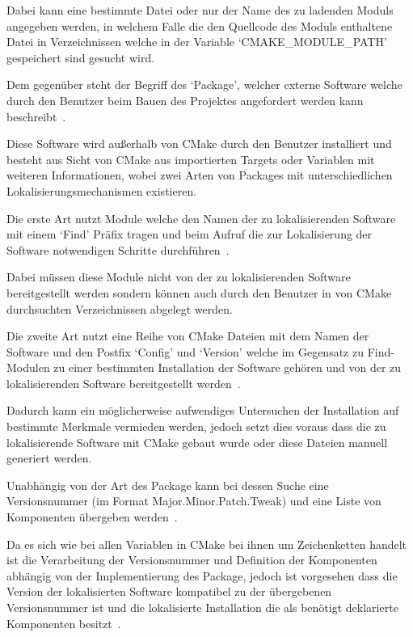 \documentclass[german,proseminar,hyperref,utf8]{zihpub}
\begin{document}
    Dabei kann eine bestimmte Datei oder nur der Name des zu ladenden Moduls angegeben werden,
    in welchem Falle die den Quellcode des Moduls enthaltene Datei in Verzeichnissen welche in
    der Variable `CMAKE\_MODULE\_PATH' gespeichert sind gesucht wird.

    Dem gegenüber steht der Begriff des `Package', welcher externe Software welche durch den
    Benutzer beim Bauen des Projektes angefordert werden kann
    beschreibt~.

    Diese Software wird au{\ss}erhalb von CMake durch den Benutzer installiert und besteht aus
    Sicht von CMake aus importierten Targets oder Variablen mit weiteren Informationen, wobei
    zwei Arten von Packages mit unterschiedlichen Lokalisierungsmechanismen existieren.

    Die erste Art nutzt Module welche den Namen der zu lokalisierenden Software mit einem `Find'
    Präfix tragen und beim Aufruf die zur Lokalisierung der Software notwendigen Schritte
    durchführen~.

    Dabei müssen diese Module nicht von der zu lokalisierenden Software bereitgestellt werden sondern
    können auch durch den Benutzer in von CMake durchsuchten Verzeichnissen abgelegt werden.

    Die zweite Art nutzt eine Reihe von CMake Dateien mit dem Namen der Software und den Postfix `Config'
    und `Version' welche im Gegensatz zu Find-Modulen zu einer bestimmten Installation der Software
    gehören und von der zu lokalisierenden Software bereitgestellt
    werden~.

    Dadurch kann ein möglicherweise aufwendiges Untersuchen der Installation auf bestimmte Merkmale
    vermieden werden, jedoch setzt dies voraus dass die zu lokalisierende Software mit CMake
    gebaut wurde oder diese Dateien manuell generiert werden.

    Unabhängig von der Art des Package kann bei dessen Suche eine Versionsnummer
    (im Format Major.Minor.Patch.Tweak) und eine Liste von Komponenten übergeben
    werden~.

    Da es sich wie bei allen Variablen in CMake bei ihnen um Zeichenketten handelt ist die Verarbeitung
    der Versionsnummer und Definition der Komponenten abhängig von der Implementierung des Package,
    jedoch ist vorgesehen dass die Version der lokalisierten Software kompatibel zu der übergebenen
    Versionsnummer ist und die lokalisierte Installation die als benötigt deklarierte Komponenten
    besitzt~.
\end{document}
